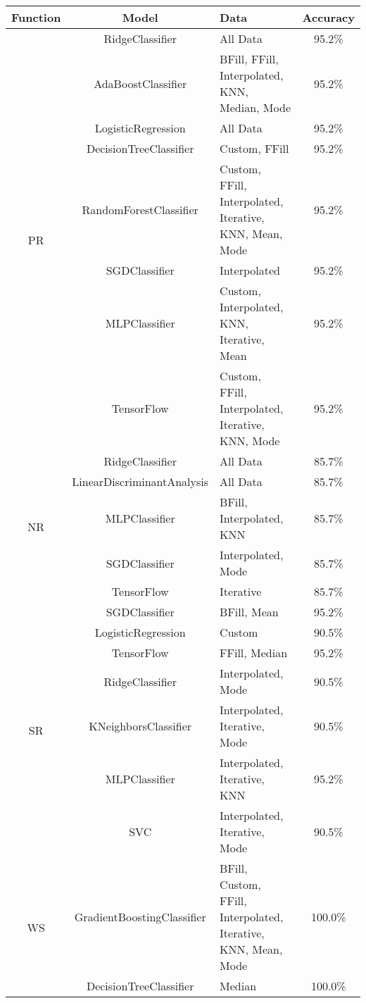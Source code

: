 \begin{table}[H]
\centering
\begin{tabular}{|c|c|p{4cm}|c|}
\hline
\textbf{Function} & \textbf{Model} & \textbf{Data} & \textbf{Accuracy} \\
\hline

\multirow{8}{*}{PR} & RidgeClassifier & All Data & 95.2\% \\
 & AdaBoostClassifier & BFill, FFill, Interpolated, KNN, Median, Mode & 95.2\% \\
 & LogisticRegression & All Data & 95.2\% \\
 & DecisionTreeClassifier & Custom, FFill & 95.2\% \\
 & RandomForestClassifier & Custom, FFill, Interpolated, Iterative, KNN, Mean, Mode & 95.2\% \\
 & SGDClassifier & Interpolated & 95.2\% \\
 & MLPClassifier & Custom, Interpolated, KNN, Iterative, Mean & 95.2\% \\
 & TensorFlow & Custom, FFill, Interpolated, Iterative, KNN, Mode & 95.2\% \\
\hline

\multirow{5}{*}{NR} & RidgeClassifier & All Data & 85.7\% \\
 & LinearDiscriminantAnalysis & All Data & 85.7\% \\
 & MLPClassifier & BFill, Interpolated, KNN & 85.7\% \\
 & SGDClassifier & Interpolated, Mode & 85.7\% \\
 & TensorFlow & Iterative & 85.7\% \\
\hline

\multirow{7}{*}{SR} & SGDClassifier & BFill, Mean & 95.2\% \\
 & LogisticRegression & Custom & 90.5\% \\
 & TensorFlow & FFill, Median & 95.2\% \\
 & RidgeClassifier & Interpolated, Mode & 90.5\% \\
 & KNeighborsClassifier & Interpolated, Iterative, Mode & 90.5\% \\
 & MLPClassifier & Interpolated, Iterative, KNN & 95.2\% \\
 & SVC & Interpolated, Iterative, Mode & 90.5\% \\
\hline

\multirow{2}{*}{WS} & GradientBoostingClassifier & BFill, Custom, FFill, Interpolated, Iterative, KNN, Mean, Mode & 100.0\% \\
 & DecisionTreeClassifier & Median & 100.0\% \\
\hline


\end{tabular}
\end{table}
